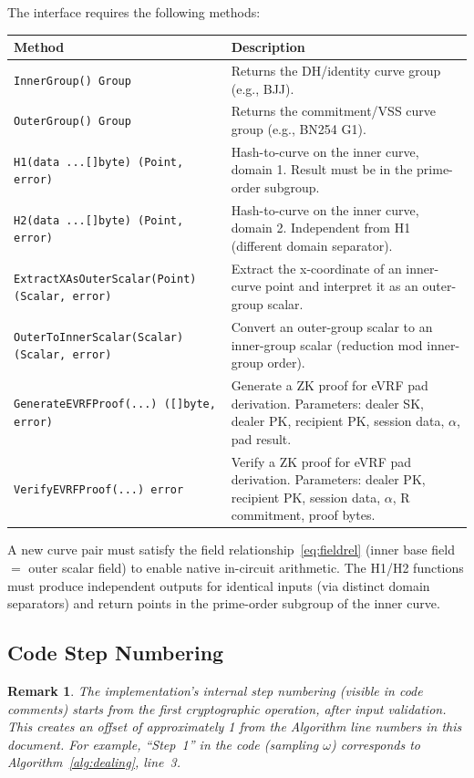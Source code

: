 \documentclass[11pt,a4paper]{article}
\newtheorem{remark}{Remark}[section]
\begin{document}
The interface requires the following methods:

\begin{center}
\renewcommand{\arraystretch}{1.3}
\begin{tabular}{@{}lp{8cm}@{}}
\toprule
\textbf{Method} & \textbf{Description} \\
\midrule
\texttt{InnerGroup() Group} & Returns the DH/identity curve group (e.g., BJJ). \\
\texttt{OuterGroup() Group} & Returns the commitment/VSS curve group (e.g., BN254 G1). \\
\texttt{H1(data ...[]byte) (Point, error)} & Hash-to-curve on the inner curve, domain 1. Result must be in the prime-order subgroup. \\
\texttt{H2(data ...[]byte) (Point, error)} & Hash-to-curve on the inner curve, domain 2. Independent from H1 (different domain separator). \\
\texttt{ExtractXAsOuterScalar(Point) (Scalar, error)} & Extract the x-coordinate of an inner-curve point and interpret it as an outer-group scalar. \\
\texttt{OuterToInnerScalar(Scalar) (Scalar, error)} & Convert an outer-group scalar to an inner-group scalar (reduction mod inner-group order). \\
\texttt{GenerateEVRFProof(...) ([]byte, error)} & Generate a ZK proof for eVRF pad derivation. Parameters: dealer SK, dealer PK, recipient PK, session data, $\alpha$, pad result. \\
\texttt{VerifyEVRFProof(...) error} & Verify a ZK proof for eVRF pad derivation. Parameters: dealer PK, recipient PK, session data, $\alpha$, R commitment, proof bytes. \\
\bottomrule
\end{tabular}
\end{center}

A new curve pair must satisfy the field relationship~\eqref{eq:fieldrel}
(inner base field $=$ outer scalar field) to enable native in-circuit
arithmetic. The H1/H2 functions must produce independent outputs for identical
inputs (via distinct domain separators) and return points in the prime-order
subgroup of the inner curve.

\subsection{Code Step Numbering}
\label{sec:step-numbering}

\begin{remark}
  The implementation's internal step numbering (visible in code comments) starts
  from the first cryptographic operation, after input validation. This creates
  an offset of approximately 1 from the Algorithm line numbers in this document.
  For example, ``Step~1'' in the code (sampling $\omega$) corresponds to
  Algorithm~\ref{alg:dealing}, line~3.
\end{remark}
\end{document}
